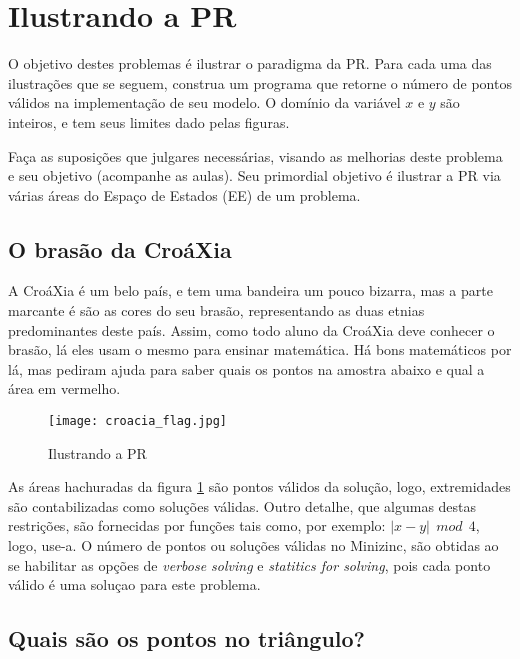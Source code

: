 
\section{Ilustrando a PR}


 O objetivo destes problemas é ilustrar o paradigma da PR.
Para cada uma das ilustrações que se seguem,
construa um programa que retorne o número de pontos válidos na implementação 
de seu modelo. O domínio da variável $x$ e $y$ são inteiros,
e tem seus limites dado pelas figuras.

Faça as suposições que julgares necessárias, visando as melhorias
deste problema e seu objetivo (acompanhe as aulas). Seu primordial
objetivo é ilustrar a PR via várias áreas do Espaço de Estados (EE) 
de um problema.



\subsection{O brasão da CroáXia}

 A CroáXia é um belo país, e tem uma bandeira
  um pouco bizarra, mas a parte marcante é são as cores do seu brasão, representando
  as duas etnias predominantes deste país. Assim, como todo aluno
  da CroáXia deve conhecer o brasão, lá eles usam o mesmo para ensinar matemática.
  Há bons matemáticos por lá, mas pediram ajuda para saber quais os pontos 
  na amostra abaixo e qual a área em vermelho.

 \begin{figure}[!ht]
  \centering
      \texttt{[image: croacia\_flag.jpg]}
      \caption{Ilustrando a PR}
\label{fig_croacia}
\end{figure}

As áreas hachuradas da figura \ref{fig_croacia} são pontos válidos da solução,
logo, extremidades são contabilizadas como soluções válidas. Outro detalhe,
que algumas destas restrições, são fornecidas por funções tais como, por 
exemplo: $| x - y| \:\: mod \:\:  4$, logo, use-a.
O número de pontos ou soluções válidas
no Minizinc, são obtidas ao se habilitar as opções de \textit{verbose solving} 
e \textit{statitics for solving}, pois cada ponto válido é uma soluçao para este problema.



\subsection{Quais são os pontos no triângulo?}

